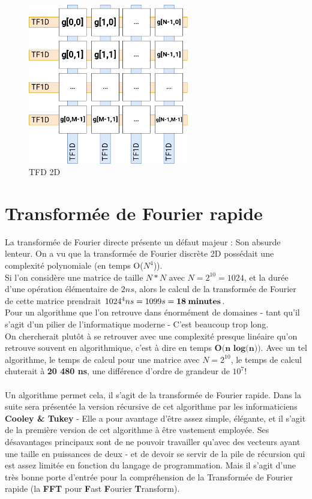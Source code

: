 \documentclass{article}
\begin{document}
\begin{figure}[!htb]
	\centering
	\includegraphics[height=7cm]{./assets/TFD2D.png}
	\caption{TFD 2D}
	\label{fig:TFD2D}
\end{figure}



\section{Transformée de Fourier rapide}

La transformée de Fourier directe présente un défaut majeur : Son absurde lenteur. On a vu que la transformée de Fourier discrète 2D possédait une complexité polynomiale (en temps O($N^4$)).\\
Si l'on considère une matrice de taille $N*N$ avec $N = 2^{10} = 1024$, et la durée d'une opération élémentaire de $2ns$, alors le calcul de la transformée de Fourier de cette matrice prendrait $1024^4ns = 1099s = \textbf{18\:minutes}$.\\
Pour un algorithme que l'on retrouve dans énormément de domaines - tant qu'il s'agit d'un pilier de l'informatique moderne - C'est beaucoup trop long.\\
On chercherait plutôt à se retrouver avec une complexité presque linéaire qu'on retrouve souvent en algorithmique, c'est à dire en temps $\textbf{O(n log(n))}$. Avec un tel algorithme, le temps de calcul pour une matrice avec $N = 2^{10}$, le temps de calcul chuterait à \textbf{20 480 ns}, une différence d'ordre de grandeur de $10^7$!\\~\\
Un algorithme permet cela, il s'agit de la transformée de Fourier rapide. Dans la suite sera présentée la version récursive de cet algorithme par les informaticiens \textbf{Cooley \& Tukey} - Elle a pour avantage d'être assez simple, élégante, et il s'agit de la première version de cet algorithme à être vastement employée. Ses désavantages principaux sont de ne pouvoir travailler qu'avec des vecteurs ayant une taille en puissances de deux - et de devoir se servir de la pile de récursion qui est assez limitée en fonction du langage de programmation.
Mais il s'agit d'une très bonne porte d'entrée pour la compréhension de la Transformée de Fourier rapide (la \textbf{FFT} pour \textbf{F}ast \textbf{F}ourier \textbf{T}ransform).
\end{document}
